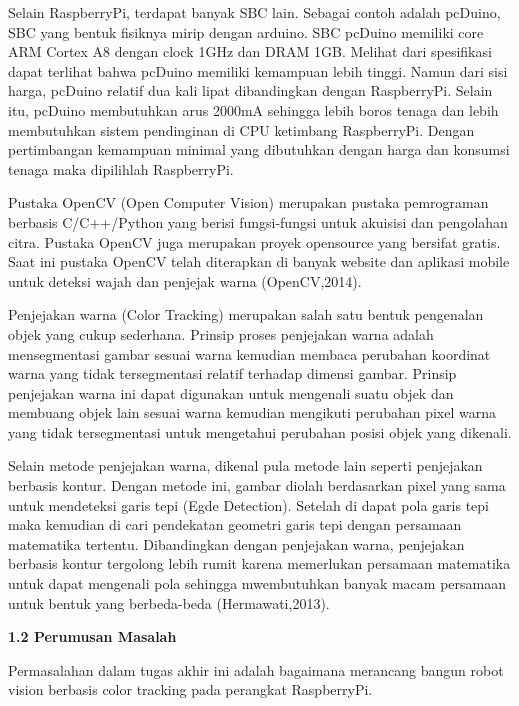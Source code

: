 \documentclass{article}
\begin{document}
Selain RaspberryPi, terdapat banyak SBC lain.
Sebagai contoh adalah pcDuino, SBC yang bentuk fisiknya mirip dengan arduino.
SBC pcDuino memiliki core ARM Cortex A8 dengan clock 1GHz dan DRAM 1GB.
Melihat dari spesifikasi dapat terlihat bahwa pcDuino memiliki kemampuan lebih tinggi.
Namun dari sisi harga, pcDuino relatif dua kali lipat dibandingkan dengan RaspberryPi.
Selain itu, pcDuino membutuhkan arus 2000mA sehingga lebih boros tenaga dan lebih membutuhkan sistem pendinginan di CPU ketimbang RaspberryPi.
Dengan pertimbangan kemampuan minimal yang dibutuhkan dengan harga dan konsumsi tenaga maka dipilihlah RaspberryPi.

Pustaka OpenCV (Open Computer Vision) merupakan pustaka pemrograman berbasis C/C++/Python yang berisi fungsi-fungsi untuk akuisisi dan pengolahan citra.
Pustaka OpenCV juga merupakan proyek opensource yang bersifat gratis.
Saat ini pustaka OpenCV telah diterapkan di banyak website dan aplikasi mobile untuk deteksi wajah dan penjejak warna (OpenCV,2014).

Penjejakan warna (Color Tracking) merupakan salah satu bentuk pengenalan objek yang cukup sederhana. 
Prinsip proses penjejakan warna adalah mensegmentasi gambar sesuai warna kemudian membaca perubahan koordinat warna yang tidak tersegmentasi relatif terhadap dimensi gambar.
Prinsip penjejakan warna ini dapat digunakan untuk mengenali suatu objek dan membuang objek lain sesuai warna kemudian mengikuti perubahan pixel warna yang tidak tersegmentasi untuk mengetahui perubahan posisi objek yang dikenali.

Selain metode penjejakan warna, dikenal pula metode lain seperti penjejakan berbasis kontur.
Dengan metode ini, gambar diolah berdasarkan pixel yang sama untuk mendeteksi garis tepi (Egde Detection).
Setelah di dapat pola garis tepi maka kemudian di cari pendekatan geometri garis tepi dengan persamaan matematika tertentu.
Dibandingkan dengan penjejakan warna, penjejakan berbasis kontur tergolong lebih rumit karena memerlukan persamaan matematika untuk dapat mengenali pola sehingga mwembutuhkan banyak macam persamaan untuk bentuk yang berbeda-beda (Hermawati,2013).
\\
\vspace{2pt}

\noindent \textbf{1.2 Perumusan Masalah}

Permasalahan dalam tugas akhir ini adalah bagaimana merancang bangun robot vision berbasis color tracking pada perangkat RaspberryPi.
\\
\vspace{2pt}
\end{document}
